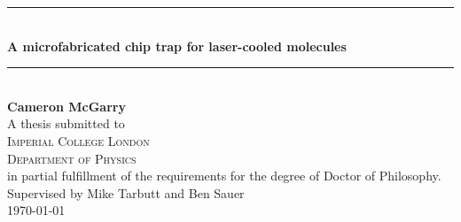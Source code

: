 \begin{titlepage}



\begin{minipage}{14cm}
  \begin{flushleft}
    \vspace*{4cm}
    \rule{\linewidth}{0.5mm} \\[0.4cm]
    {\huge \bfseries A microfabricated chip trap for laser-cooled molecules}\\
    \rule{\linewidth}{0.5mm} \\[1.0cm]
    {\large \textbf{Cameron McGarry}} \\[1.0cm]
    {
    A thesis submitted to \\
    {\large \textsc{Imperial College London}} \\
    {\large \textsc{Department of Physics}} \\
    in partial fulfillment of the requirements for the degree of Doctor of
    Philosophy. \\[5mm]
    }
    Supervised by Mike Tarbutt and Ben Sauer \\[5mm]
    \makeatletter
    \monthyeardate\today
    \makeatother
    \restoregeometry
  \end{flushleft}
\end{minipage}

\end{titlepage}
